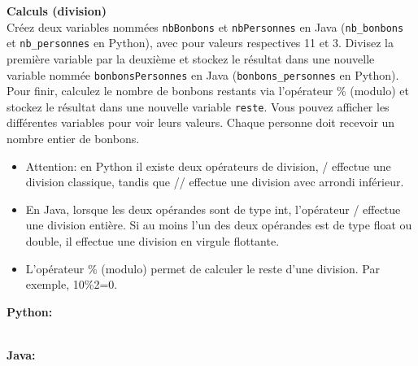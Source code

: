  \begin{Exercice} \textbf{Calculs (division)}\\
     Créez deux variables nommées \texttt{nbBonbons} et \texttt{nbPersonnes} en Java (\texttt{nb\_bonbons} et \texttt{nb\_personnes} en Python), avec pour valeurs respectives 11 et 3. Divisez la première variable par la deuxième et stockez le résultat dans une nouvelle variable nommée \texttt{bonbonsPersonnes} en Java (\texttt{bonbons\_personnes} en Python). Pour finir, calculez le nombre de bonbons restants via l'opérateur \% (modulo) et stockez le résultat dans une nouvelle variable \texttt{reste}. Vous pouvez afficher les différentes variables pour voir leurs valeurs. Chaque personne doit recevoir un nombre entier de bonbons.\\
     
      \begin{conseil}
         \begin{itemize}
            \item Attention: en Python il existe deux opérateurs de division, / effectue une division classique, tandis que // effectue une division avec arrondi inférieur.
            \item En Java, lorsque les deux opérandes sont de type int, l'opérateur / effectue une division entière. Si au moins l'un des deux opérandes est de type float ou double, il effectue une division en virgule flottante.
            \item L'opérateur \% (modulo) permet de calculer le reste d'une division. Par exemple, 10\%2=0.
         \end{itemize}
      \end{conseil}
      \begin{solution}
      
      \textbf{Python:}
      
      
      
      \textbf{\\Java:}
      
             
      \end{solution}   
  \end{Exercice}
  
